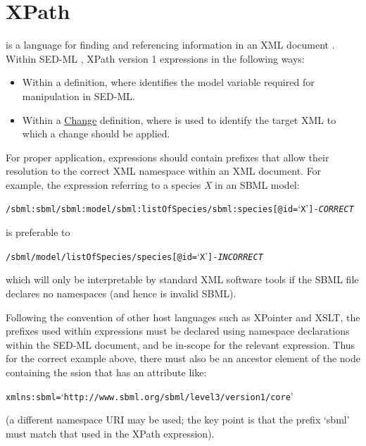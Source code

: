 \section{XPath}  
\label{sec:xpath}
 is a language for finding and referencing information in an XML document \citep{xpath:1999}. Within SED-ML \currentLV, XPath version 1 expressions  in the following ways:

\begin{itemize}
	\item {Within a \Variable definition, where  identifies the model variable required for manipulation in SED-ML.}
	\item {Within a \hyperref[class:change]{Change} definition, where  is used to identify the target XML to which a change should be applied.}
\end{itemize}

For proper application,  expressions should contain prefixes that allow their resolution to the correct XML namespace within an XML document. For example, the  expression referring to a species \emph{X} in an SBML model:
\begin{alltt}
/sbml:sbml/sbml:model/sbml:listOfSpecies/sbml:species[@id=`X'] {\tickYes -\emph{CORRECT}}
\end{alltt}
is preferable to 
\begin{alltt}
/sbml/model/listOfSpecies/species[@id=`X'] {\tickNo -\emph{INCORRECT} }
\end{alltt}

which will only be interpretable by standard XML software tools if the SBML file declares no namespaces (and hence is invalid SBML).

Following the convention of other  host languages such as XPointer and XSLT, the prefixes used within  expressions must be declared using namespace declarations within the SED-ML document, and be in-scope for the relevant expression. Thus for the correct example above, there must also be an ancestor element of the node containing the 
ssion that has an attribute like:
\begin{alltt}
xmlns:sbml=`http://www.sbml.org/sbml/level3/version1/core'
\end{alltt}
(a different namespace URI may be used; the key point is that the prefix `sbml' must match that used in the XPath expression).


